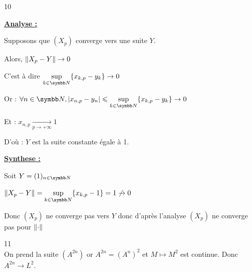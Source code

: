 \begin{correction}{10}

    \uline{\textbf{Analyse :}}
    
    Supposons que $(X_p)$ converge vers une suite $Y$.
       
    Alors, $\left\|X_p - Y\right\| \to 0$

    C'est à dire $\ds\sup_{k\in\N}\{x_{k,p}-y_k\} \to 0$

    Or : $\forall n\in\N, \abs{x_{n,p} - y_n } \leqslant \ds\sup_{k\in\N}\{x_{k,p}-y_k\} \to 0 $

    Et : $x_{n,p} \xrightarrow[p\to+\infty]{} 1 $

    D'où : $Y$ est la suite constante égale à 1.

    \uline{\textbf{Synthese :}}

    Soit $Y = (1)_{n\in\N}$

    $\norm{X_p-Y} = \ds\sup_{k\in\N}\{x_{k,p} - 1\} = 1 \not\to 0$

    Donc $(X_p)$ ne converge pas vers $Y$ donc d'après l'analyse $(X_p)$ ne converge pas pour $\left\|\cdot\right\|$
\end{correction}


\begin{correction}{11} \\
On prend la suite $(A^{2n})$ or $A^{2n} = (A^n)^2$ et $M \mapsto M^2$ est continue. Donc $A^{2n} \rightarrow L^2$.
\end{correction}

